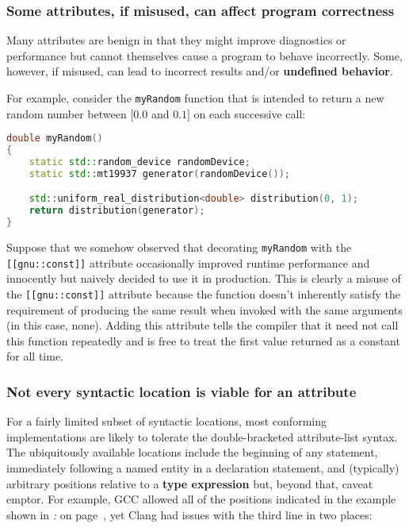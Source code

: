 \subsubsection[Some attributes, if misused, can affect program correctness]{Some attributes, if misused, can affect program correctness}\label{some-attributes,-if-misused,-can-affect-program-correctness}

Many attributes are benign in that they might improve diagnostics or
performance but cannot themselves cause a program to behave incorrectly.
Some, however, if misused, can lead to incorrect
results and/or \textbf{undefined behavior}.

For example, consider the \texttt{myRandom} function that is intended to
return a new random number between $[0.0$ and $0.1]$ on each successive
call:

\begin{lstlisting}[language=C++]
double myRandom()
{
    static std::random_device randomDevice;
    static std::mt19937 generator(randomDevice());

    std::uniform_real_distribution<double> distribution(0, 1);
    return distribution(generator);
}
\end{lstlisting}

\noindent Suppose that we somehow observed that decorating \texttt{myRandom} with
the \texttt{[[gnu::const]]} attribute occasionally improved runtime
performance and innocently but naively decided to use it in production. This
is clearly a misuse of the \texttt{[[gnu::const]]} attribute because the
function doesn't inherently satisfy the requirement of producing the
same result when invoked with the same arguments (in this case, none).
Adding this attribute tells the compiler that it need not call this
function repeatedly and is free to treat the first value returned as a
constant for all time.

\subsubsection[Not every syntactic location is viable for an attribute]{Not every syntactic location is viable for an attribute}\label{not-every-syntactic-location-is-viable-for-an-attribute}

For a fairly limited subset of syntactic locations, most
conforming implementations are likely to tolerate the double-bracketed
attribute-list syntax. The ubiquitously available locations include the
beginning of any statement, immediately following a named entity in a
declaration statement, and (typically) arbitrary positions relative to a
\textbf{type expression} but, beyond that, caveat emptor. For example, GCC
allowed all of the positions indicated in the example shown in
{\it{}:} {\it{}} on page~\pageref{attribute-gcc-example}, yet Clang had
issues with the third line in two places:

